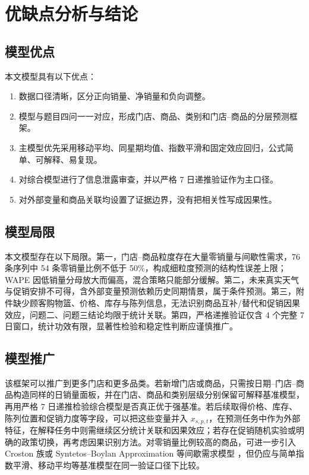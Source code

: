 \section{优缺点分析与结论}

\subsection{模型优点}

本文模型具有以下优点：
\begin{enumerate}
  \item 数据口径清晰，区分正向销量、净销量和负向调整。
  \item 模型与题目四问一一对应，形成门店、商品、类别和门店--商品的分层预测框架。
  \item 主模型优先采用移动平均、同星期均值、指数平滑和固定效应回归，公式简单、可解释、易复现。
  \item 对综合模型进行了信息泄露审查，并以严格 7 日递推验证作为主口径。
  \item 对外部变量和商品关联均设置了证据边界，没有把相关性写成因果性。
\end{enumerate}

\subsection{模型局限}

本文模型存在以下局限。第一，门店--商品粒度存在大量零销量与间歇性需求，76 条序列中 54 条零销量比例不低于 50\%，构成细粒度预测的结构性误差上限；WAPE 因低销量分母放大而偏高，混合策略只能部分缓解。第二，未来真实天气与促销安排不可得，含外部变量预测依赖历史同期情景，属于条件预测。第三，附件缺少顾客购物篮、价格、库存与陈列信息，无法识别商品互补/替代和促销因果效应，问题二、问题三结论均限于统计关联。第四，严格递推验证仅含 4 个完整 7 日窗口，统计功效有限，显著性检验和稳定性判断应谨慎推广。

\subsection{模型推广}

该框架可以推广到更多门店和更多品类。若新增门店或商品，只需按日期--门店--商品构造同样的日销量面板，并在门店、商品和类别层级分别保留可解释基准模型，再用严格 7 日递推检验综合模型是否真正优于强基准。若后续取得价格、库存、陈列位置和促销力度等字段，可以把这些变量并入 $x_{s,p,t}$，在预测任务中作为外部特征，在解释任务中则需继续区分统计关联和因果效应；若存在促销随机实验或明确的政策切换，再考虑因果识别方法。对零销量比例较高的商品，可进一步引入 Croston 族或 Syntetos--Boylan Approximation 等间歇需求模型 \cite{syntetos2005accuracy}，但仍应与简单指数平滑、移动平均等基准模型在同一验证口径下比较。

